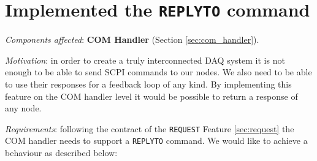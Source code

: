 \section{Implemented the \texttt{REPLYTO} command}
\label{sec:replyto}

\textit{Components affected}: \textbf{COM Handler} (Section \ref{sec:com_handler}).

\textit{Motivation}: in order to create a truly interconnected DAQ system it is not enough to be able to send SCPI commands to our nodes. We also need to be able to use their responses for a feedback loop of any kind. By implementing this feature on the COM handler level it  would be possible to return a response of any node.

\textit{Requirements}: following the contract of the \texttt{REQUEST} Feature \ref{sec:request} the COM handler needs to support a \texttt{REPLYTO} command. We would like to achieve a behaviour as described below:

